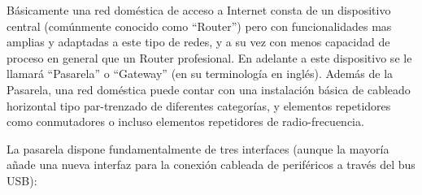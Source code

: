 \documentclass[12pt, twoside]{article}
\begin{document}
    Básicamente una red doméstica de acceso a Internet consta de un dispositivo central (comúnmente conocido como ``Router'') pero con funcionalidades mas amplias y adaptadas a este tipo de redes, y a su vez con menos capacidad de proceso en general que un Router profesional. En adelante a este dispositivo se le llamará ``Pasarela'' o ``Gateway'' (en su terminología en inglés). Además de la Pasarela, una red doméstica puede contar con una instalación básica de cableado horizontal tipo par-trenzado de diferentes categorías, y elementos repetidores como conmutadores o incluso elementos repetidores de radio-frecuencia.

    La pasarela dispone fundamentalmente de tres interfaces (aunque la mayoría añade una nueva interfaz para la conexión cableada de periféricos a través del bus USB): 
\end{document}
